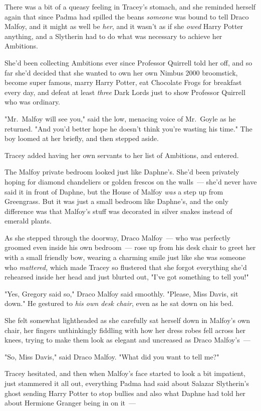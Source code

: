 There was a bit of a queasy feeling in Tracey's stomach, and she reminded
herself again that since Padma had spilled the beans \emph{someone} was bound
to tell Draco Malfoy, and it might as well be \emph{her}, and it wasn't as if
she \emph{owed} Harry Potter anything, and a Slytherin had to do what was
necessary to achieve her Ambitions.

She'd been collecting Ambitions ever since Professor Quirrell told her off, and
so far she'd decided that she wanted to own her own Nimbus 2000 broomstick,
become super famous, marry Harry Potter, eat Chocolate Frogs for breakfast
every day, and defeat at least \emph{three} Dark Lords just to show Professor
Quirrell who was ordinary.

"Mr.~Malfoy will see you," said the low, menacing voice of Mr.~Goyle as he
returned. "And you'd better hope he doesn't think you're wasting his time." The
boy loomed at her briefly, and then stepped aside.

Tracey added having her own servants to her list of Ambitions, and entered.

The Malfoy private bedroom looked just like Daphne's. She'd been privately
hoping for diamond chandeliers or golden frescos on the walls~--- she'd never
have said it in front of Daphne, but the House of Malfoy \emph{was} a step up
from Greengrass. But it was just a small bedroom like Daphne's, and the only
difference was that Malfoy's stuff was decorated in silver snakes instead of
emerald plants.

As she stepped through the doorway, Draco Malfoy~--- who was perfectly groomed
even inside his own bedroom~--- rose up from his desk chair to greet her with a
small friendly bow, wearing a charming smile just like she was someone who
\emph{mattered,} which made Tracey so flustered that she forgot everything
she'd rehearsed inside her head and just blurted out, "I've got something to
tell you!"

"Yes, Gregory said so," Draco Malfoy said smoothly. "Please, Miss Davis, sit
down." He gestured to \emph{his own desk chair}, even as he sat down on his bed.

She felt somewhat lightheaded as she carefully sat herself down in Malfoy's own
chair, her fingers unthinkingly fiddling with how her dress robes fell across
her knees, trying to make them look as elegant and uncreased as Draco
Malfoy's~---

"So, Miss Davis," said Draco Malfoy. "What did you want to tell me?"

Tracey hesitated, and then when Malfoy's face started to look a bit impatient,
just stammered it all out, everything Padma had said about Salazar Slytherin's
ghost sending Harry Potter to stop bullies and also what Daphne had told her
about Hermione Granger being in on it~---

